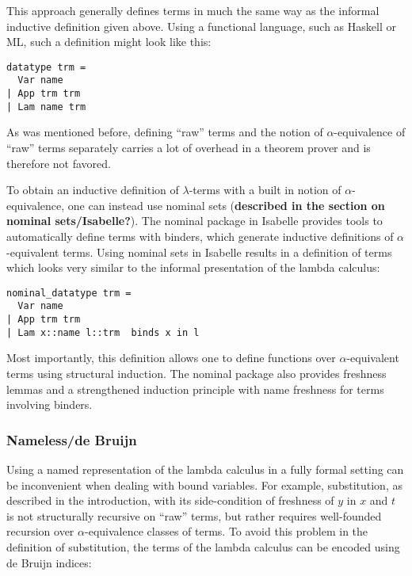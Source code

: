\documentclass[a4paper, 12pt, twoside]{style/ociamthesis}
\theoremstyle{plain}
\theoremstyle{definition}
\theoremstyle{remark}
\begin{document}
This approach generally defines terms in much the same way as the
informal inductive definition given above. Using a functional language,
such as Haskell or ML, such a definition might look like this:

\begin{verbatim}
datatype trm =
  Var name
| App trm trm
| Lam name trm
\end{verbatim}

As was mentioned before, defining ``raw'' terms and the notion of
\(\alpha\)-equivalence of ``raw'' terms separately carries a lot of
overhead in a theorem prover and is therefore not favored.

To obtain an inductive definition of \(\lambda\)-terms with a built in
notion of \(\alpha\)-equivalence, one can instead use nominal sets
(\textbf{described in the section on nominal sets/Isabelle?}). The
nominal package in Isabelle provides tools to automatically define terms
with binders, which generate inductive definitions of
\(\alpha\)-equivalent terms. Using nominal sets in Isabelle results in a
definition of terms which looks very similar to the informal
presentation of the lambda calculus:

\begin{verbatim}
nominal_datatype trm =
  Var name
| App trm trm
| Lam x::name l::trm  binds x in l
\end{verbatim}

Most importantly, this definition allows one to define functions over
\(\alpha\)-equivalent terms using structural induction. The nominal
package also provides freshness lemmas and a strengthened induction
principle with name freshness for terms involving binders.

\subsubsection{Nameless/de Bruijn}\label{namelessde-bruijn}

Using a named representation of the lambda calculus in a fully formal
setting can be inconvenient when dealing with bound variables. For
example, substitution, as described in the introduction, with its
side-condition of freshness of \(y\) in \(x\) and \(t\) is not
structurally recursive on ``raw'' terms, but rather requires
well-founded recursion over \(\alpha\)-equivalence classes of terms. To
avoid this problem in the definition of substitution, the terms of the
lambda calculus can be encoded using de Bruijn indices:
\end{document}
